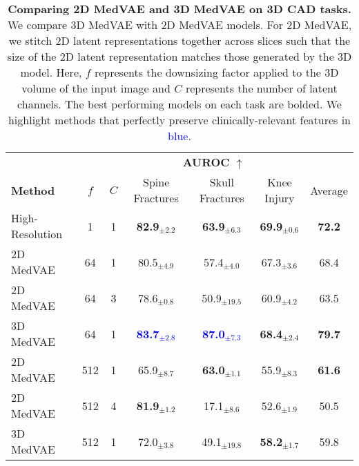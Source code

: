 \begin{table*}[ht]
\centering
{%
\begin{tabular}{ lcccccc }
\toprule
\textbf{}
& \multicolumn{2}{c}{\textbf{}}
& \multicolumn{3}{c}{\textbf{AUROC} $\uparrow$}
& \textbf{}
\\
\cmidrule(l{3pt}r{0pt}){4-6}
\cmidrule(l{3pt}r{0pt}){7-7}
\textbf{Method}
& \textbf{$f$}
& \textbf{$C$}
& \small Spine Fractures
& \small Skull Fractures
& \small Knee Injury
& Average
\\ 
\midrule
\small High-Resolution & 1 & 1  & \textbf{82.9$_{\pm2.2}$} & \textbf{63.9$_{\pm6.3}$} & \textbf{69.9$_{\pm0.6}$} & \textbf{72.2}\\

\midrule
\small 2D MedVAE  & 64 & 1  & 80.5$_{\pm4.9}$ & 57.4$_{\pm4.0}$ & 67.3$_{\pm3.6}$ &  68.4\\
\small 2D MedVAE & 64 & 3  & 78.6$_{\pm0.8}$ & 50.9$_{\pm19.5}$ & 60.9$_{\pm4.2}$ &  63.5\\
\small 3D MedVAE & 64 & 1  & \textcolor{blue}{\textbf{83.7$_{\pm2.8}$}} & \textcolor{blue}{\textbf{87.0$_{\pm7.3}$}} & \textbf{68.4$_{\pm2.4}$} & \textbf{79.7}\\
\midrule
\small 2D MedVAE & 512 & 1  & 65.9$_{\pm8.7}$ & \textbf{63.0$_{\pm1.1}$} & 55.9$_{\pm8.3}$ & \textbf{61.6} \\
\small 2D MedVAE  & 512 & 4  & \textbf{81.9$_{\pm1.2}$} & 17.1$_{\pm8.6}$ & 52.6$_{\pm1.9}$ & 50.5 \\
\small 3D MedVAE & 512 & 1  & 72.0$_{\pm3.8}$ & 49.1$_{\pm19.8}$ & \textbf{58.2$_{\pm1.7}$} & 59.8 \\
\bottomrule
\end{tabular}
}
\caption{\textbf{Comparing 2D MedVAE and 3D MedVAE on 3D CAD tasks.} We compare 3D MedVAE with 2D MedVAE models. For 2D MedVAE, we stitch 2D latent representations together across slices such that the size of the 2D latent representation matches those generated by the 3D model. Here, $f$ represents the downsizing factor applied to the 3D volume of the input image and $C$ represents the number of latent channels. The best performing models on each task are bolded. We highlight methods that perfectly preserve clinically-relevant features in \textcolor{blue}{blue}.}
\label{table:2d3dcad}
\vspace{-1mm}
\end{table*}




